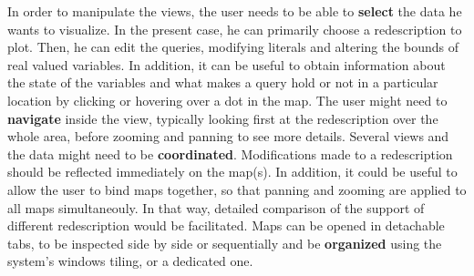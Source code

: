 In order to manipulate the views, the user needs to be able to
\textbf{select} the data he wants to visualize. In the present case,
he can primarily choose a redescription to plot. Then, he can edit the
queries, modifying literals and altering the bounds of real valued
variables. In addition, it can be useful to obtain information about
the state of the variables and what makes a query hold or not in a
particular location by clicking or hovering over a dot in the map.
The user might need to \textbf{navigate} inside the view, typically
looking first at the redescription over the whole area, before zooming
and panning to see more details. Several views and the data might need
to be \textbf{coordinated}.  Modifications made to a redescription
should be reflected immediately on the map(s). In addition, it could
be useful to allow the user to bind maps together, so that panning and
zooming are applied to all maps simultaneouly. In that way, detailed
comparison of the support of different redescription would be
facilitated.  Maps can be opened in detachable tabs, to be inspected
side by side or sequentially and be \textbf{organized} using the
system's windows tiling, or a dedicated one.

